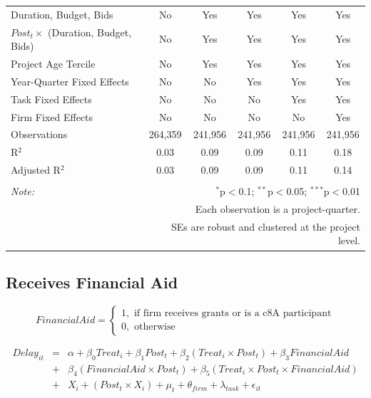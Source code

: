 \documentclass[
]{article}
\begin{document}
\begin{table}[H]
\begin{tabular}{@{\extracolsep{-2pt}}lccccc}
Duration, Budget, Bids & No & Yes & Yes & Yes & Yes \\ 
$Post_t \times $  (Duration, Budget, Bids) & No & Yes & Yes & Yes & Yes \\ 
Project Age Tercile & No & Yes & Yes & Yes & Yes \\ 
Year-Quarter Fixed Effects & No & No & Yes & Yes & Yes \\ 
Task Fixed Effects & No & No & No & Yes & Yes \\ 
Firm Fixed Effects & No & No & No & No & Yes \\ 
Observations & 264,359 & 241,956 & 241,956 & 241,956 & 241,956 \\ 
R$^{2}$ & 0.03 & 0.09 & 0.09 & 0.11 & 0.18 \\ 
Adjusted R$^{2}$ & 0.03 & 0.09 & 0.09 & 0.11 & 0.14 \\ 
\hline 
\hline \\[-1.8ex] 
\textit{Note:}  & \multicolumn{5}{r}{$^{*}$p$<$0.1; $^{**}$p$<$0.05; $^{***}$p$<$0.01} \\ 
 & \multicolumn{5}{r}{Each observation is a project-quarter.} \\ 
 & \multicolumn{5}{r}{SEs are robust and clustered at the project level.} \\ 
\end{tabular} 
\end{table}

\hypertarget{receives-financial-aid}{%
\subsection{Receives Financial Aid}\label{receives-financial-aid}}

\[ FinancialAid = \begin{cases} 1, \text{ if firm receives grants or is a c8A participant}\\
0, \text{ otherwise} \end{cases}\]

\[ \begin{aligned}
Delay_{it} &=& \alpha+\beta_0 Treat_i + \beta_1 Post_t + \beta_2 (Treat_i \times Post_t) +\beta_3 FinancialAid \\
&+& \beta_4 (FinancialAid \times Post_t) + \beta_5 (Treat_i \times Post_t \times FinancialAid) \\ 
&+&X_i + (Post_t \times X_i) + \mu_t + \theta_{firm} + \lambda_{task}+ \epsilon_{it}
\end{aligned}\]
\end{document}
